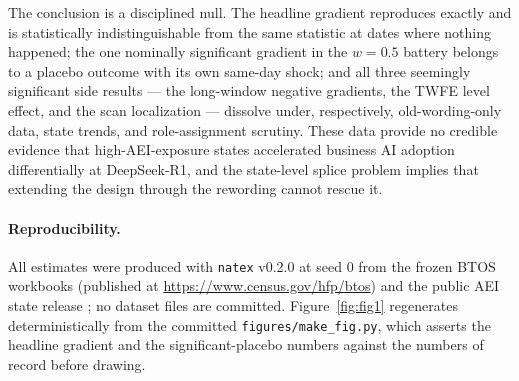 \documentclass[11pt]{article}
\newcommand{\natex}{\texttt{natex}}
\begin{document}
The conclusion is a disciplined null. The headline gradient reproduces
exactly and is statistically indistinguishable from the same statistic at
dates where nothing happened; the one nominally significant gradient in the
$w=0.5$ battery belongs to a placebo outcome with its own same-day shock;
and all three seemingly significant side results --- the long-window
negative gradients, the TWFE level effect, and the scan localization ---
dissolve under, respectively, old-wording-only data, state trends, and
role-assignment scrutiny. These data provide no credible evidence that
high-AEI-exposure states accelerated business AI adoption differentially at
DeepSeek-R1, and the state-level splice problem implies that extending the
design through the rewording cannot rescue it.

\paragraph{Reproducibility.} All estimates were produced with \natex{}
v0.2.0 \cite{natex} at seed 0 from the frozen BTOS workbooks (published at
\url{https://www.census.gov/hfp/btos}) and the public AEI state release
\cite{appel2025}; no dataset files are committed. Figure~\ref{fig:fig1}
regenerates deterministically from the committed
\texttt{figures/make\_fig.py}, which asserts the headline gradient and the
significant-placebo numbers against the numbers of record before drawing.
\end{document}
